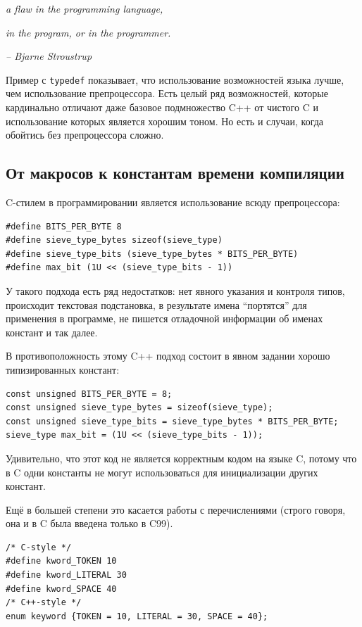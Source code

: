 \documentclass[a4paper,12pt,oneside]{book}
\begin{document}
\hfill\textit{a flaw in the programming language,}

\hfill\textit{in the program, or in the programmer.}{\vspace{0.5em}}

\hfill\textit{-- Bjarne Stroustrup}

Пример с \lstinline!typedef! показывает, что использование возможностей языка лучше, чем использование препроцессора. Есть целый ряд возможностей, которые кардинально отличают даже базовое подмножество C++ от чистого C и использование которых является хорошим тоном. Но есть и случаи, когда обойтись без препроцессора сложно.

\subsection{От макросов к константам времени компиляции}\label{ConstVsDef}

C-стилем в программировании является использование всюду препроцессора:

\begin{lstlisting}
#define BITS_PER_BYTE 8
#define sieve_type_bytes sizeof(sieve_type)
#define sieve_type_bits (sieve_type_bytes * BITS_PER_BYTE)
#define max_bit (1U << (sieve_type_bits - 1))
\end{lstlisting}

У такого подхода есть ряд недостатков: нет явного указания и контроля типов, происходит текстовая подстановка, в результате имена ``портятся'' для применения в программе, не пишется отладочной информации об именах констант и так далее.

В противоположность этому C++ подход состоит в явном задании хорошо типизированных констант:

\begin{lstlisting}
const unsigned BITS_PER_BYTE = 8;
const unsigned sieve_type_bytes = sizeof(sieve_type);
const unsigned sieve_type_bits = sieve_type_bytes * BITS_PER_BYTE;
sieve_type max_bit = (1U << (sieve_type_bits - 1));
\end{lstlisting}

Удивительно, что этот код не является корректным кодом на языке C, потому что в C одни константы не могут использоваться для инициализации других констант.

Ещё в большей степени это касается работы с перечислениями (строго говоря, она и в C была введена только в C99).

\begin{lstlisting}
/* C-style */
#define kword_TOKEN 10
#define kword_LITERAL 30
#define kword_SPACE 40
/* C++-style */
enum keyword {TOKEN = 10, LITERAL = 30, SPACE = 40};
\end{lstlisting}
\end{document}
